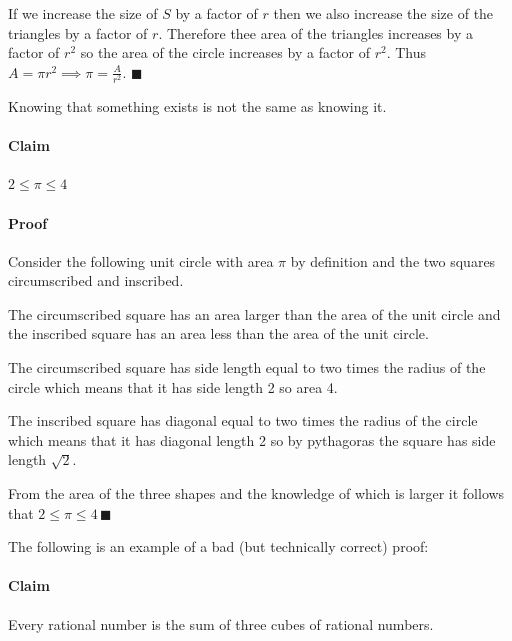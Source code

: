 \documentclass{article}
\newcounter{example}[section]
\begin{document}
If we increase the size of \(S\) by a factor of \(r\) then we also increase the size of the triangles by a factor of \(r\). Therefore thee area of the triangles increases by a factor of \(r^2\) so the area of the circle increases by a factor of \(r^2\). Thus \(A=\pi r^2\implies \pi = \frac{A}{r^2}\). \(\blacksquare\)

Knowing that something exists is not the same as knowing it.

\paragraph{Claim} \(2\le\pi\le4\)

\paragraph{Proof} Consider the following unit circle with area \(\pi\) by definition and the two squares circumscribed and inscribed.

\begin{center}
\end{center}

The circumscribed square has an area larger than the area of the unit circle and the inscribed square has an area less than the area of the unit circle.

The circumscribed square has side length equal to two times the radius of the circle which means that it has side length 2 so area 4.

The inscribed square has diagonal equal to two times the radius of the circle which means that it has diagonal length 2 so by pythagoras the square has side length \(\sqrt 2\).

From the area of the three shapes and the knowledge of which is larger it follows that \(2\le\pi\le4\,\blacksquare\)

The following is an example of a bad (but technically correct) proof:

\paragraph{Claim} Every rational number is the sum of three cubes of rational numbers.
\end{document}
